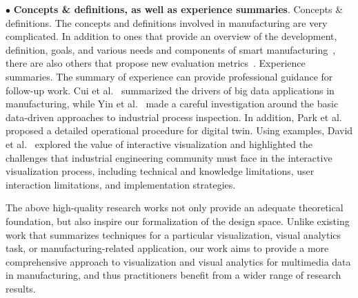\documentclass[a4paper,fleqn]{cas-dc}
\begin{document}
$\bullet$ \textbf{Concepts \& definitions, as well as experience summaries}.
 Concepts \& definitions. The concepts and definitions involved in manufacturing are very complicated. In addition to ones that provide an overview of the development, definition, goals, and various needs and components of smart manufacturing~\cite{Qu2020}, there are also others that propose new evaluation metrics~\cite{Baboli2021}.
 Experience summaries. The summary of experience can provide professional guidance for follow-up work. Cui et al.~\cite{Cui2020} summarized the drivers of big data applications in manufacturing, while Yin et al.~\cite{Yin2014} made a careful investigation around the basic data-driven approaches to industrial process inspection. In addition, Park et al.~\cite{Park2020} proposed a detailed operational procedure for digital twin.
Using examples, David et al.~\cite{FontVivanco2019} explored the value of interactive visualization and highlighted the challenges that industrial engineering community must face in the interactive visualization process, including technical and knowledge limitations, user interaction limitations, and implementation strategies. 

The above high-quality research works not only provide an adequate theoretical foundation, but also inspire our formalization of the design space. Unlike existing work that summarizes techniques for a particular visualization, visual analytics task, or manufacturing-related application, our work aims to provide a more comprehensive approach to visualization and visual analytics for multimedia data in manufacturing, and thus practitioners benefit from a wider range of research results.
   
\end{document}
